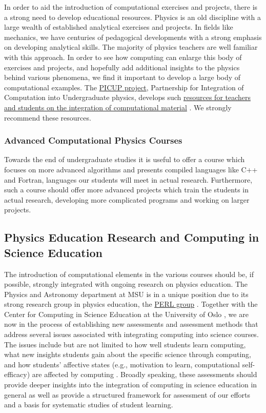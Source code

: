 \documentclass[graybox,envcountchap,sectrefs]{svmult}
\begin{document}
In order to aid the introduction of computational exercises and
projects, there is a strong need to develop educational resources.
Physics is an old discipline with a large wealth of established analytical exercises and
projects. In fields like mechanics, we have centuries of pedagogical
developments with a strong emphasis on developing analytical
skills. The majority of physics teachers are well familiar with this approach.
In order to see how computing  can enlarge this body of exercises
and projects, and hopefully add additional insights to the physics
behind various phenomena, we find it important to develop a large body
of computational examples.
The
\href{{http://www.compadre.org/picup/}}{PICUP project}, Partnership for
Integration of Computation into Undergraduate physics, develops such
\href{{http://www.compadre.org/PICUP/resources/}}{resources for teachers and students on the integration of
computational material} \cite{PICUP}.
We strongly recommend these resources.


\subsubsection{Advanced Computational Physics Courses}
Towards the end of undergraduate studies it is useful to offer a course which focuses on more advanced algorithms and presents compiled languages like C++ and Fortran, languages our students will meet in actual research.
Furthermore, such a course should offer more advanced projects which train the students in actual research, developing more complicated programs and working on larger projects.

\subsection{Physics Education Research and Computing in Science Education}
The introduction of computational elements in the various courses should be, if possible,  strongly integrated with ongoing research on physics education.
The Physics and Astronomy department at MSU is in a unique position due to its strong research group in physics education, the \href{{http://www.pa.msu.edu/research/physics-education-lab}}{PERL group} \cite{PERLMSU}. Together with the Center for Computing in Science Education at the University of Oslo \cite{CCSEUiO}, we are now in the process
of establishing new assessments
and assessment methods that address several issues associated with
integrating computing into science courses. The issues include but
are not limited to how well students learn computing, what new
insights students gain about the specific science through computing,
and how students' affective states (e.g., motivation to learn,
computational self-efficacy) are affected by computing . Broadly
speaking, these assessments should provide deeper insights into the
integration of computing  in science education in general as well as
provide a structured framework for assessment of our efforts and a
basis for systematic studies of student learning.
\end{document}

